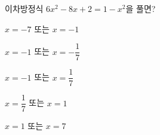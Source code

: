 이차방정식 $6x^2-8x+2=1-x^2$을 풀면?
\begin{choicesii}{\rule[-3ex]{0pt}{8ex}$x=-7$ 또는 $x=-1$}{\rule[-3ex]{0pt}{8ex}$x=-1$ 또는 $x=-\dfrac{1}{7}$}{\rule[-3ex]{0pt}{8ex}$x=-1$ 또는 $x=\dfrac{1}{7}$}{\rule[-3ex]{0pt}{8ex}$x=\dfrac{1}{7}$ 또는 $x=1$}{\rule[-3ex]{0pt}{8ex}$x=1$ 또는 $x=7$}\end{choicesii}
